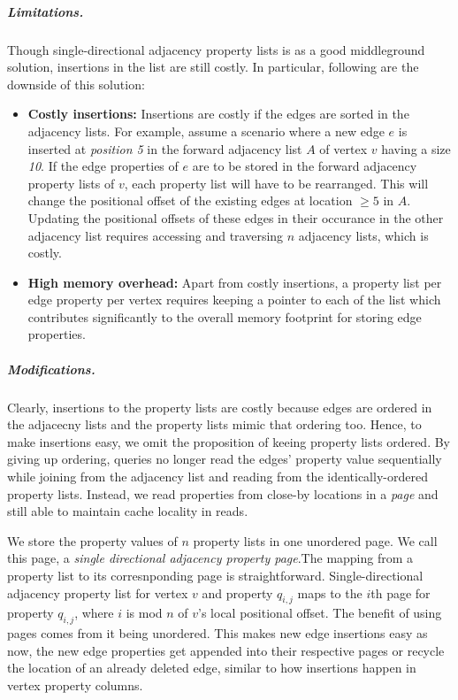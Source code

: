 \vspace{-12pt}
\subparagraph{Limitations.}Though single-directional adjacency property lists is as a good middleground solution, insertions in the list are still costly. In particular, following are the downside of this solution:
\begin{itemize}
	\item \textbf{Costly insertions:} Insertions are costly if the edges are sorted in the adjacency lists. For example, assume a scenario where a new edge $e$ is inserted at \emph{position 5} in the forward adjacency list $A$ of vertex $v$ having a size \emph{10}. If the edge properties of $e$ are to be stored in the forward adjacency property lists of $v$, each property list will have to be rearranged. This will change the positional offset of the existing edges at location $\geq5$ in $A$. Updating the positional offsets of these edges in their occurance in the other adjacency list requires accessing and traversing $n$ adjacency lists, which is costly.
	
	\item \textbf{High memory overhead:} Apart from costly insertions, a property list per edge property per vertex requires keeping a pointer to each of the list which contributes significantly to the overall memory footprint for storing edge properties.
\end{itemize}

\vspace{-16pt}
\subparagraph{Modifications.}Clearly, insertions to the property lists are costly because edges are ordered in the adjacecny lists and the property lists mimic that ordering too. Hence, to make insertions easy, we omit the proposition of keeing property lists ordered. By giving up ordering, queries no longer read the edges' property value sequentially while joining from the adjacency list and reading from the identically-ordered property lists. Instead, we read properties from close-by locations in a \emph{page} and still able to maintain cache locality in reads.

We store the property values of $n$ property lists in one unordered page. We call this page, a \emph{single directional adjacency property page}.The mapping from a property list to its corresnponding page is straightforward. Single-directional adjacency property list for vertex $v$ and property $q_{i,j}$ maps to the $i$th page for property $q_{i,j}$, where $i$ is mod $n$ of $v$'s local positional offset. The benefit of using pages comes from it being unordered. This makes new edge insertions easy as now, the new edge properties get appended into their respective pages or recycle the location of an already deleted edge, similar to how insertions happen in vertex property columns. 

